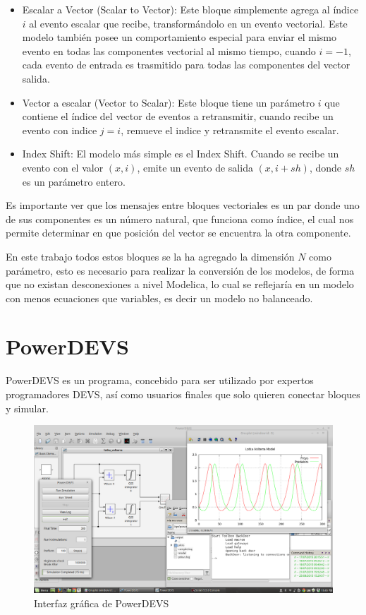 	\begin{itemize}
		\item Escalar a Vector (Scalar to Vector): Este bloque simplemente agrega al índice $i$ al evento escalar que recibe, transformándolo en un 
			evento vectorial. Este modelo también posee un comportamiento especial para enviar el mismo evento en todas las componentes vectorial 
			al mismo tiempo, cuando $i = -1$, cada evento de entrada es trasmitido para todas las componentes del vector salida.
		\item Vector a escalar (Vector to Scalar): Este bloque tiene un parámetro $i$ que contiene el índice del vector de eventos a retransmitir, 
			cuando recibe un evento con indice $j=i$, remueve el indice y retransmite el evento escalar.
		\item Index Shift: El modelo más simple es el Index Shift. Cuando se recibe un evento con el valor $(x,i)$, emite un evento de salida $(x, i+sh)$, 
			donde $sh$ es un parámetro entero.
	\end{itemize}

	Es importante ver que los mensajes entre bloques vectoriales es un par donde uno de sus componentes es un número natural, que funciona como índice,
	el cual nos permite determinar en que posición del vector se encuentra la otra componente.

	En este trabajo todos estos bloques se la ha agregado la dimensión $N$ como parámetro, esto es necesario para realizar la conversión de los modelos,
	 de forma que no existan desconexiones a nivel Modelica, lo cual se reflejaría en un modelo con menos ecuaciones que variables, es decir un modelo 
	no balanceado.
	 
\section{PowerDEVS}
	PowerDEVS\cite{BK11}  es un programa, concebido para ser utilizado por expertos programadores DEVS, así como usuarios finales que solo quieren 
	conectar bloques y simular.

	\begin{figure}[!htbp]
	  \includegraphics[width=\textwidth]{powerdevs}
	  \caption{Interfaz gráfica de PowerDEVS}
	   \label{fig:powerdevsgui}
	\end{figure}

